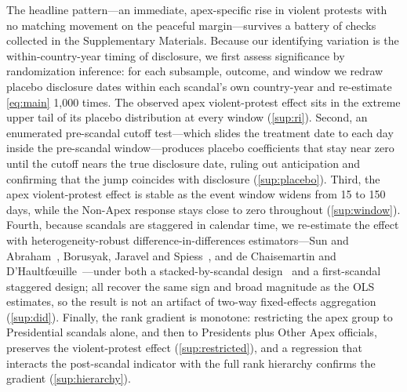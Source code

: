 \documentclass[11pt]{article}
\begin{document}
The headline pattern---an immediate, apex-specific rise in violent protests with no matching movement on the peaceful margin---survives a battery of checks collected in the Supplementary Materials. Because our identifying variation is the within-country-year timing of disclosure, we first assess significance by randomization inference: for each subsample, outcome, and window we redraw placebo disclosure dates within each scandal's own country-year and re-estimate \autoref{eq:main} 1{,}000 times. The observed apex violent-protest effect sits in the extreme upper tail of its placebo distribution at every window (\autoref{sup:ri}). Second, an enumerated pre-scandal cutoff test---which slides the treatment date to each day inside the pre-scandal window---produces placebo coefficients that stay near zero until the cutoff nears the true disclosure date, ruling out anticipation and confirming that the jump coincides with disclosure (\autoref{sup:placebo}). Third, the apex violent-protest effect is stable as the event window widens from 15 to 150 days, while the Non-Apex response stays close to zero throughout (\autoref{sup:window}). Fourth, because scandals are staggered in calendar time, we re-estimate the effect with heterogeneity-robust difference-in-differences estimators---Sun and Abraham~\citep{sun2021estimating}, Borusyak, Jaravel and Spiess~\citep{borusyak2024revisiting}, and de Chaisemartin and D'Haultf{\oe}uille~\citep{decade2024dcdh}---under both a stacked-by-scandal design~\citep{cengiz2019effect} and a first-scandal staggered design; all recover the same sign and broad magnitude as the OLS estimates, so the result is not an artifact of two-way fixed-effects aggregation (\autoref{sup:did}). Finally, the rank gradient is monotone: restricting the apex group to Presidential scandals alone, and then to Presidents plus Other Apex officials, preserves the violent-protest effect (\autoref{sup:restricted}), and a regression that interacts the post-scandal indicator with the full rank hierarchy confirms the gradient (\autoref{sup:hierarchy}).

\end{document}
